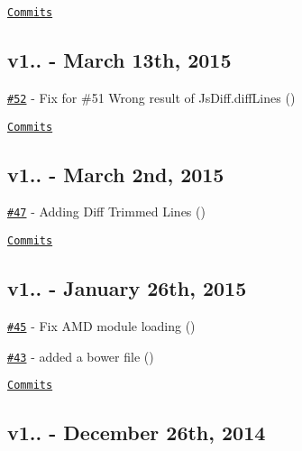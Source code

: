 \href{https://github.com/kpdecker/jsdiff/compare/v1.3.1...v1.3.2}{\tt Commits}

\subsection*{v1.. -\/ March 13th, 2015}


\begin{DoxyItemize}
\item \href{https://github.com/kpdecker/jsdiff/pull/52}{\tt \#52} -\/ Fix for \#51 Wrong result of Js\+Diff.\+diff\+Lines (\href{https://api.github.com/users/felicienfrancois}{\tt })
\end{DoxyItemize}

\href{https://github.com/kpdecker/jsdiff/compare/v1.3.0...v1.3.1}{\tt Commits}

\subsection*{v1.. -\/ March 2nd, 2015}


\begin{DoxyItemize}
\item \href{https://github.com/kpdecker/jsdiff/pull/47}{\tt \#47} -\/ Adding Diff Trimmed Lines (\href{https://api.github.com/users/JamesGould123}{\tt })
\end{DoxyItemize}

\href{https://github.com/kpdecker/jsdiff/compare/v1.2.2...v1.3.0}{\tt Commits}

\subsection*{v1.. -\/ January 26th, 2015}


\begin{DoxyItemize}
\item \href{https://github.com/kpdecker/jsdiff/pull/45}{\tt \#45} -\/ Fix A\+MD module loading (\href{https://api.github.com/users/pedrocarrico}{\tt })
\item \href{https://github.com/kpdecker/jsdiff/pull/43}{\tt \#43} -\/ added a bower file (\href{https://api.github.com/users/nbrustein}{\tt })
\end{DoxyItemize}

\href{https://github.com/kpdecker/jsdiff/compare/v1.2.1...v1.2.2}{\tt Commits}

\subsection*{v1.. -\/ December 26th, 2014}


